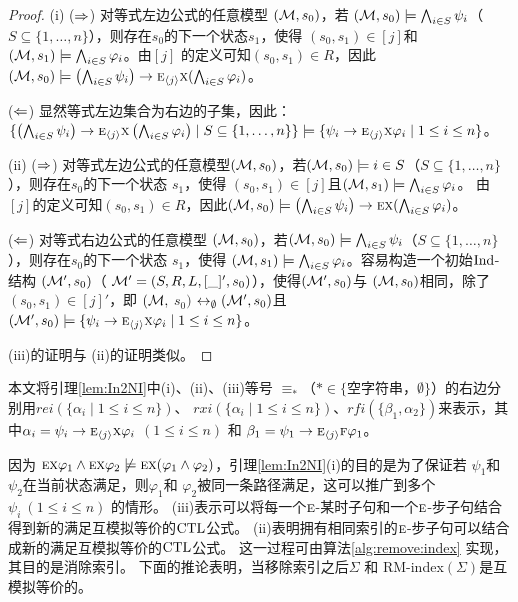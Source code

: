 \begin{proof}
	(i) ($\Rightarrow$) 对等式左边公式的任意模型 $({\cal M},s_0)$，若 $({\cal M},s_0) \models \bigwedge_{i\in S}\psi_i$（ $S \subseteq  \{1, \dots, n\}$），则存在$s_0$的下一个状态$s_1$，使得 $(s_0, s_1) \in [j]$和 $({\cal M}, s_1) \models \bigwedge_{i\in S} \varphi_i$。由$[j]$ 的定义可知$(s_0, s_1) \in R$，因此$({\cal M}, s_0) \models \left(\bigwedge_{i\in S}\psi_i\right) \rightarrow \textsc{e}_{{\langle{j}\rangle}} \textsc{x} (\bigwedge_{i\in S} \varphi_i)$。 %
	
	($\Leftarrow$)  显然等式左边集合为右边的子集，因此：
	$\{\left(\bigwedge_{i\in S}\psi_i\right)\rightarrow \textsc{e}_{{\langle{j}\rangle}} \textsc{x} \left(\bigwedge_{i\in S}\varphi_i\right)\mid S\subseteq\{1,\dots, n\}\} \models \{\psi_i\rightarrow \textsc{e}_{{\langle{j}\rangle}} \textsc{x} \varphi_i \mid 1\le i\le n\}$。
	
	(ii) ($\Rightarrow$) 对等式左边公式的任意模型$({\cal M},s_0)$，若$({\cal M},s_0) \models {i\in S}$（$S \subseteq  \{1, \dots, n\}$），则存在$s_0$的下一个状态 $s_1$，使得 $(s_0, s_1) \in [j]$且$({\cal M}, s_1) \models \bigwedge_{i\in S} \varphi_i$。 由 $[j]$的定义可知$(s_0, s_1) \in R$，因此$({\cal M}, s_0) \models \left(\bigwedge_{i\in S}\psi_i\right) \rightarrow \textsc{e} \textsc{x} (\bigwedge_{i\in S} \varphi_i)$。 %
	
	($\Leftarrow$) 对等式右边公式的任意模型 $({\cal M},s_0)$，若$({\cal M},s_0) \models \bigwedge_{i\in S}\psi_i$（$S \subseteq  \{1, \dots, n\}$），则存在$s_0$的下一个状态 $s_1$，使得 $({\cal M}, s_1) \models \bigwedge_{i\in S} \varphi_i$。容易构造一个初始$\textrm{Ind}$-结构 $({\cal M}',s_0)$（ ${\cal M}'=(S,R,L,[\_]',s_0)$），使得$({\cal M}', s_0)$与 $({\cal M}, s_0)$相同，除了 $(s_0, s_1) \in [j]'$，即 $({\cal M},$ $s_0)$ $\leftrightarrow_{\emptyset} ({\cal M}', s_0)$且 $({\cal M}',s_0) \models \{\psi_i\rightarrow \textsc{e}_{{\langle{j}\rangle}} \textsc{x} \varphi_i \mid 1\le i\le n\}$。
	
	(iii)的证明与 (ii)的证明类似。
\end{proof}


本文将引理\ref{lem:In2NI}中(i)、(ii)、(iii)等号 $\equiv_*$（$* \in \{$空字符串，$\emptyset\}$）的右边分别用$rei(\{\alpha_i\mid 1\le i\le n\})$、
$rxi(\{\alpha_i\mid 1\le i\le n\})$、$rfi(\{\beta_1,\alpha_2\})$来表示，其中$\alpha_i=\psi_i\rightarrow \textsc{e}_{{\langle{j}\rangle}} \textsc{x} \varphi_i$ $(1\le i\le n)$ 和 $\beta_1=\psi_1 \rightarrow \textsc{e}_{{\langle{j}\rangle}}\textsc{f} \varphi_1$。



因为 $\textsc{e}\textsc{x}\varphi_1\land \textsc{e}\textsc{x}\varphi_2\not\models \textsc{e}\textsc{x}(\varphi_1\land\varphi_2)$，引理\ref{lem:In2NI}(i)的目的是为了保证若 $\psi_1$和 $\psi_2$在当前状态满足，则$\varphi_1$和 $\varphi_2$被同一条路径满足，这可以推广到多个 $\psi_i~(1\le i\le n)$ 的情形。
(iii)表示可以将每一个$\textsc{e}$-某时子句和一个$\textsc{e}$-步子句结合得到新的满足互模拟等价的$\textrm{CTL}$公式。
(ii)表明拥有相同索引的$\textsc{e}$-步子句可以结合成新的满足互模拟等价的$\textrm{CTL}$公式。
这一过程可由算法\ref{alg:remove:index} 实现，其目的是消除索引。
下面的推论表明，当移除索引之后$\Sigma$ 和 RM-index$(\Sigma)$是互模拟等价的。

